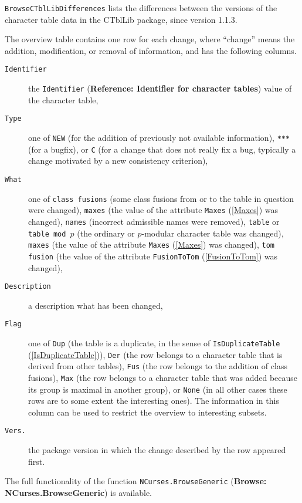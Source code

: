 \documentclass[a4paper,11pt]{report}
\begin{document}
{{{ \texttt{BrowseCTblLibDifferences} lists the differences between the versions of the character table data in the \textsf{CTblLib} package, since version 1.1.3. 

 The overview table contains one row for each change, where ``change'' means the addition, modification, or removal of information, and has the
following columns. 

 
\begin{description}
\item[{\texttt{Identifier}}]  the \texttt{Identifier} (\textbf{Reference: Identifier for character tables}) value of the character table, 
\item[{\texttt{Type}}]  one of \texttt{NEW} (for the addition of previously not available information), \texttt{***} (for a bugfix), or \texttt{C} (for a change that does not really fix a bug, typically a change motivated by
a new consistency criterion), 
\item[{\texttt{What}}]  one of \texttt{class fusions} (some class fusions from or to the table in question were changed), \texttt{maxes} (the value of the attribute \texttt{Maxes} (\ref{Maxes}) was changed), \texttt{names} (incorrect admissible names were removed), \texttt{table} or \texttt{table mod }$p$ (the ordinary or $p$-modular character table was changed), \texttt{maxes} (the value of the attribute \texttt{Maxes} (\ref{Maxes}) was changed), \texttt{tom fusion} (the value of the attribute \texttt{FusionToTom} (\ref{FusionToTom}) was changed), 
\item[{\texttt{Description}}]  a description what has been changed, 
\item[{\texttt{Flag}}]  one of \texttt{Dup} (the table is a duplicate, in the sense of \texttt{IsDuplicateTable} (\ref{IsDuplicateTable})), \texttt{Der} (the row belongs to a character table that is derived from other tables), \texttt{Fus} (the row belongs to the addition of class fusions), \texttt{Max} (the row belongs to a character table that was added because its group is
maximal in another group), or \texttt{None} (in all other cases {\textendash}these rows are to some extent the interesting
ones). The information in this column can be used to restrict the overview to
interesting subsets. 
\item[{\texttt{Vers.}}]  the package version in which the change described by the row appeared first. 
\end{description}
 

 The full functionality of the function \texttt{NCurses.BrowseGeneric} (\textbf{Browse: NCurses.BrowseGeneric}) is available. 

}}}
\end{document}

